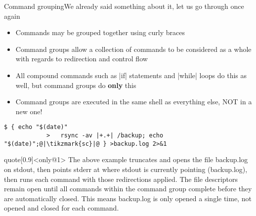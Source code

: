 \begin{frame}[fragile]{Command grouping}{We already said something about it, let us go through once again}
    \vspace{-4mm}
    \begin{overlayarea}{\textwidth}{0.7\textheight}
        \begin{itemize}
            \item Commands may be grouped together using curly braces \PB{\texttt{\{\ldots\}}}
            \item Command groups allow a collection of commands to be considered as a whole with regards to redirection and control flow
            \item All compound commands such as \bash|if| statements and \bash|while| loops do this as well, but command groups do \textbf{only} this
            \item Command groups are executed in the same shell as everything else, NOT in a new one!
        \end{itemize}
        \begin{lstlisting}[style=MyBash, numbers=none]
            $ { echo "$(date)"
            >   rsync -av |+.+| /backup; echo "$(date)";@|\tikzmark{sc}|@ } >backup.log 2>&1
        \end{lstlisting}
        \smallskip
        \begin{varblock}{quote}[0.9\textwidth]{}<only@1>
            The above example truncates and opens the file backup.log on stdout, then points stderr at where stdout is currently pointing (backup.log), then runs each command with those redirections applied.
            The file descriptors remain open until all commands within the command group complete before they are automatically closed.
            This means backup.log is only opened a single time, not opened and closed for each command.
        \end{varblock}
    \end{overlayarea}
\end{frame}
